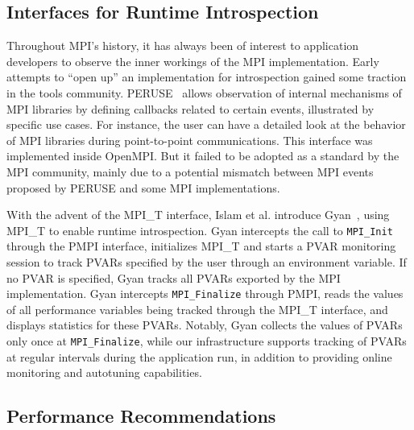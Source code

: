 \subsection{Interfaces for Runtime Introspection}

Throughout MPI’s history, it has always been of interest to application developers to observe the inner workings of the MPI implementation. Early attempts to “open up” an implementation for introspection gained some traction in the tools community.
PERUSE~\cite{keller06} allows observation of internal mechanisms of MPI libraries by defining callbacks related to certain events, illustrated by specific use cases. 
For instance, the user can have a detailed look at the behavior of MPI libraries during point-to-point communications.
This interface was implemented inside OpenMPI. 
But it failed to be adopted as a standard by the MPI community, mainly due to a potential mismatch between MPI events proposed by PERUSE and some MPI implementations. \par
With the advent of the MPI\_T interface, Islam et al. introduce Gyan~\cite{Islam:2014:ECN:2642769.2642781}, using MPI\_T to enable runtime introspection. Gyan intercepts the call to \verb+MPI_Init+ through the PMPI interface, initializes MPI\_T and starts a PVAR monitoring session to track PVARs specified by the user through an environment variable. If no PVAR is specified, Gyan tracks all PVARs exported by the MPI implementation. Gyan intercepts \verb+MPI_Finalize+ through PMPI, reads the values of all performance variables being tracked through the MPI\_T interface, and displays statistics for these PVARs. Notably, Gyan collects the values of PVARs only once at \verb+MPI_Finalize+, while our infrastructure supports tracking of PVARs at regular intervals during the application run, in addition to providing online monitoring and autotuning capabilities.

\subsection{Performance Recommendations}

